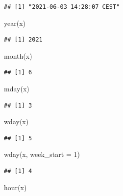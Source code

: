 \documentclass[
]{book}
\newenvironment{Shaded}{\begin{snugshade}}{\end{snugshade}}
\newcommand{\AttributeTok}[1]{\textcolor[rgb]{0.77,0.63,0.00}{#1}}
\newcommand{\DecValTok}[1]{\textcolor[rgb]{0.00,0.00,0.81}{#1}}
\newcommand{\FunctionTok}[1]{\textcolor[rgb]{0.00,0.00,0.00}{#1}}
\newcommand{\NormalTok}[1]{#1}
\begin{document}
\begin{verbatim}
## [1] "2021-06-03 14:28:07 CEST"
\end{verbatim}

\begin{Shaded}
\begin{Highlighting}[]
\FunctionTok{year}\NormalTok{(x)}
\end{Highlighting}
\end{Shaded}

\begin{verbatim}
## [1] 2021
\end{verbatim}

\begin{Shaded}
\begin{Highlighting}[]
\FunctionTok{month}\NormalTok{(x)}
\end{Highlighting}
\end{Shaded}

\begin{verbatim}
## [1] 6
\end{verbatim}

\begin{Shaded}
\begin{Highlighting}[]
\FunctionTok{mday}\NormalTok{(x)}
\end{Highlighting}
\end{Shaded}

\begin{verbatim}
## [1] 3
\end{verbatim}

\begin{Shaded}
\begin{Highlighting}[]
\FunctionTok{wday}\NormalTok{(x)}
\end{Highlighting}
\end{Shaded}

\begin{verbatim}
## [1] 5
\end{verbatim}

\begin{Shaded}
\begin{Highlighting}[]
\FunctionTok{wday}\NormalTok{(x, }\AttributeTok{week\_start =} \DecValTok{1}\NormalTok{)}
\end{Highlighting}
\end{Shaded}

\begin{verbatim}
## [1] 4
\end{verbatim}

\begin{Shaded}
\begin{Highlighting}[]
\FunctionTok{hour}\NormalTok{(x)}
\end{Highlighting}
\end{Shaded}
\end{document}
